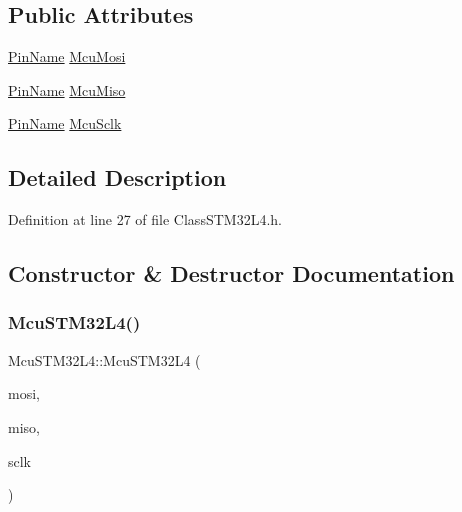 \subsection*{Public Attributes}
\begin{DoxyCompactItemize}
\item 
\mbox{\hyperlink{_class_s_t_m32_l0_8h_a5ceb873075d76667eb54dc6a7d2734d1}{Pin\+Name}} \mbox{\hyperlink{class_mcu_s_t_m32_l4_a57b6d088d088ea3aca6318371f54486b}{Mcu\+Mosi}}
\item 
\mbox{\hyperlink{_class_s_t_m32_l0_8h_a5ceb873075d76667eb54dc6a7d2734d1}{Pin\+Name}} \mbox{\hyperlink{class_mcu_s_t_m32_l4_aefd030de1784ff86cc5d863879a72365}{Mcu\+Miso}}
\item 
\mbox{\hyperlink{_class_s_t_m32_l0_8h_a5ceb873075d76667eb54dc6a7d2734d1}{Pin\+Name}} \mbox{\hyperlink{class_mcu_s_t_m32_l4_a84284db2727aa1409e7872cd26dee564}{Mcu\+Sclk}}
\end{DoxyCompactItemize}


\subsection{Detailed Description}


Definition at line 27 of file Class\+S\+T\+M32\+L4.\+h.



\subsection{Constructor \& Destructor Documentation}
\mbox{\label{class_mcu_s_t_m32_l4_a0ba47738d97cb51cbe91e2b905801a1e}} 
\subsubsection{\texorpdfstring{Mcu\+S\+T\+M32\+L4()}{McuSTM32L4()}}
{\footnotesize\ttfamily Mcu\+S\+T\+M32\+L4\+::\+Mcu\+S\+T\+M32\+L4 (\begin{DoxyParamCaption}\item[{\mbox{\hyperlink{_class_s_t_m32_l0_8h_a5ceb873075d76667eb54dc6a7d2734d1}{Pin\+Name}}}]{mosi,  }\item[{\mbox{\hyperlink{_class_s_t_m32_l0_8h_a5ceb873075d76667eb54dc6a7d2734d1}{Pin\+Name}}}]{miso,  }\item[{\mbox{\hyperlink{_class_s_t_m32_l0_8h_a5ceb873075d76667eb54dc6a7d2734d1}{Pin\+Name}}}]{sclk }\end{DoxyParamCaption})}



